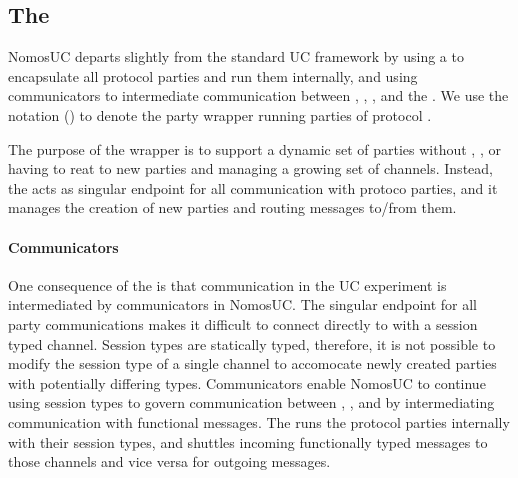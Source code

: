 

\subsection{The \partywrapper}
NomosUC departs slightly from the standard UC framework by using a \partywrapper to encapsulate all protocol parties and run them internally, and using communicators to intermediate communication between \Z, \A, \F, and the \partywrapper.
We use the notation (\PI) to denote the party wrapper running parties of protocol \PI.

The purpose of the wrapper is to support a dynamic set of parties without \Z, \A, or \F having to reat to new parties and managing a growing set of channels.
Instead, the \partywrapper acts as singular endpoint for all communication with protoco parties, and it manages the creation of new parties and routing messages to/from them.

\paragraph{Communicators}
One consequence of the \partywrapper is that communication in the UC experiment is intermediated by communicators in NomosUC.
The singular endpoint for all party communications makes it difficult to connect \pw directly to \Z with a session typed channel.
Session types are statically typed, therefore, it is not possible to modify the session type of a single channel to accomocate newly created parties with potentially differing types. 
Communicators enable NomosUC to continue using session types to govern communication between \Z, \PI, and \F by intermediating communication with functional messages.
The \pw runs the protocol parties internally with their session types, and shuttles incoming functionally typed messages to those channels and vice versa for outgoing messages.

